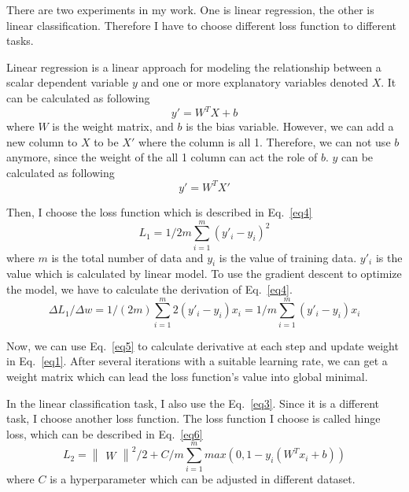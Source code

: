 \documentclass[journal, a4paper]{IEEEtran}
\begin{document}
There are two experiments in my work. One is linear regression, the other is linear classification. Therefore I have to choose different loss function to different tasks.

Linear regression is a linear approach for modeling the relationship between a scalar dependent variable $y$ and one or more explanatory variables denoted $X$. It can be calculated as following
\begin{equation}
y' = W^TX+b \label{eq2}
\end{equation}
where $W$ is the weight matrix, and $b$ is the bias variable. However, we can add a new column to $X$ to be $X'$ where the column is all 1. Therefore, we can not use $b$ anymore, since the weight of the all 1 column can act the role of $b$. $y$ can be calculated as following
\begin{equation}
y' = W^TX' \label{eq3}
\end{equation}


Then, I choose the loss function which is described in Eq.~\eqref{eq4}
\begin{equation}
L_1 = 1/{2m} \sum_{i=1}^m(y'_i-y_i)^2 \label{eq4}
\end{equation}
where $m$ is the total number of data and $y_i$ is the value of training data. $y'_i$ is the value which is calculated by linear model. To use the gradient descent to optimize the model, we have to calculate the derivation of Eq.~\eqref{eq4}.
\begin{equation}
\Delta L_1 / \Delta w = 1/(2m) \sum_{i=1}^m 2(y'_i-y_i)x_i = 1/m \sum_{i=1}^m (y'_i-y_i)x_i
\label{eq5}
\end{equation}

Now, we can use Eq.~\eqref{eq5} to calculate derivative at each step and update weight in Eq.~\eqref{eq1}. After several iterations with a suitable learning rate, we can get a weight matrix which can lead the loss function's value into global minimal.

In the linear classification task, I also use the Eq.~\eqref{eq3}. Since it is a different task, I choose another loss function. The loss function I choose is called hinge loss, which can be described in Eq.~\eqref{eq6}
\begin{equation}
L_2 = \begin{Vmatrix}W\end{Vmatrix}^2/2 + C/m \sum_{i=1}^m max(0, 1-y_i(W^Tx_i+b)) 
\label{eq6}
\end{equation}
where $C$ is a hyperparameter which can be adjusted in different dataset.
\end{document}
